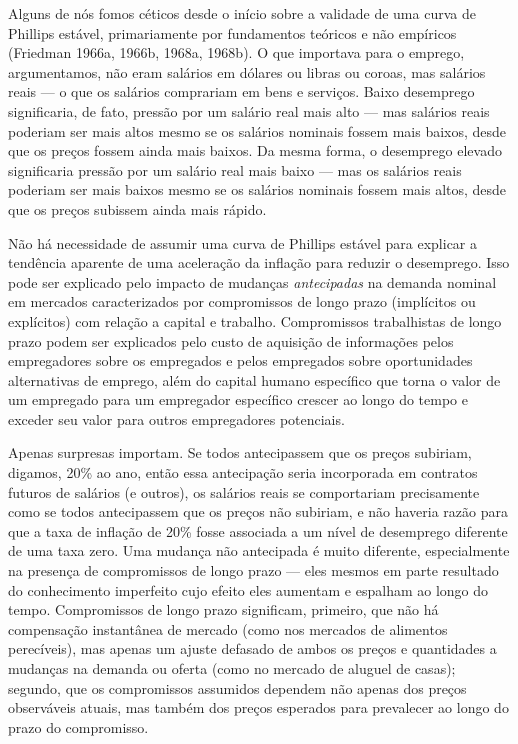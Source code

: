 \documentclass[12pt]{article}
\begin{document}
Alguns de nós fomos céticos desde o início sobre a validade de uma curva de Phillips estável, primariamente por fundamentos teóricos e não empíricos (Friedman 1966a, 1966b, 1968a, 1968b). O que importava para o emprego, argumentamos, não eram salários em dólares ou libras ou coroas, mas salários reais — o que os salários comprariam em bens e serviços. Baixo desemprego significaria, de fato, pressão por um salário real mais alto — mas salários reais poderiam ser mais altos mesmo se os salários nominais fossem mais baixos, desde que os preços fossem ainda mais baixos. Da mesma forma, o desemprego elevado significaria pressão por um salário real mais baixo — mas os salários reais poderiam ser mais baixos mesmo se os salários nominais fossem mais altos, desde que os preços subissem ainda mais rápido.

Não há necessidade de assumir uma curva de Phillips estável para explicar a tendência aparente de uma aceleração da inflação para reduzir o desemprego. Isso pode ser explicado pelo impacto de mudanças \textit{antecipadas} na demanda nominal em mercados caracterizados por compromissos de longo prazo (implícitos ou explícitos) com relação a capital e trabalho. Compromissos trabalhistas de longo prazo podem ser explicados pelo custo de aquisição de informações pelos empregadores sobre os empregados e pelos empregados sobre oportunidades alternativas de emprego, além do capital humano específico que torna o valor de um empregado para um empregador específico crescer ao longo do tempo e exceder seu valor para outros empregadores potenciais.

Apenas surpresas importam. Se todos antecipassem que os preços subiriam, digamos, 20\% ao ano, então essa antecipação seria incorporada em contratos futuros de salários (e outros), os salários reais se comportariam precisamente como se todos antecipassem que os preços não subiriam, e não haveria razão para que a taxa de inflação de 20\% fosse associada a um nível de desemprego diferente de uma taxa zero. Uma mudança não antecipada é muito diferente, especialmente na presença de compromissos de longo prazo — eles mesmos em parte resultado do conhecimento imperfeito cujo efeito eles aumentam e espalham ao longo do tempo. Compromissos de longo prazo significam, primeiro, que não há compensação instantânea de mercado (como nos mercados de alimentos perecíveis), mas apenas um ajuste defasado de ambos os preços e quantidades a mudanças na demanda ou oferta (como no mercado de aluguel de casas); segundo, que os compromissos assumidos dependem não apenas dos preços observáveis atuais, mas também dos preços esperados para prevalecer ao longo do prazo do compromisso.
\end{document}
